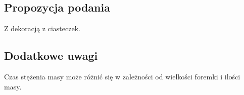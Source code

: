 \vspace{0.5cm}

\small
\subsection*{Propozycja podania}
Z dekoracją z ciasteczek.

\vspace{0.3cm}

\subsection*{Dodatkowe uwagi}
Czas stężenia masy może różnić się w zależności od wielkości foremki i ilości masy.

\newpage
